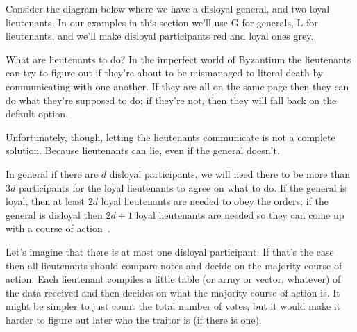 Consider the  diagram below where we have a disloyal general, and two loyal lieutenants. In our examples in this section we'll use G for generals, L for lieutenants, and we'll make disloyal participants red and loyal ones grey.

\begin{center}
\end{center}

What are lieutenants to do? In the imperfect world of Byzantium the lieutenants can try to figure out if they're about to be mismanaged to literal death by communicating with one another. If they are all on the same page then they can do what they're supposed to do; if they're not, then they will fall back on the default option.

Unfortunately, though, letting the lieutenants communicate is not a complete solution. Because lieutenants can lie, even if the general doesn't.

\begin{center}
\end{center}

In general if there are $d$ disloyal participants, we will need there to be more than $3d$ participants for the loyal lieutenants to agree on what to do. If the general is loyal, then at least $2d$ loyal lieutenants are needed to obey the orders; if the general is disloyal then $2d+1$ loyal lieutenants are needed so they can come up with a course of action~\cite{mte241}.

Let's imagine that there is at most one disloyal participant. If that's the case then all lieutenants should compare notes and decide on the majority course of action. Each lieutenant compiles a little table (or array or vector, whatever) of the data received and then decides on what the majority course of action is. It might be simpler to just count the total number of votes, but it would make it harder to figure out later who the traitor is (if there is one).

